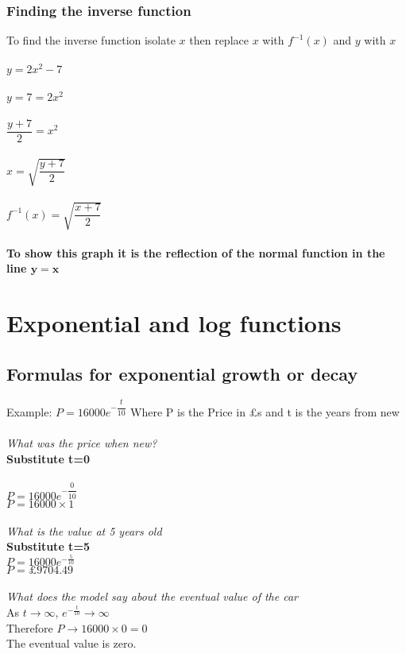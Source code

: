 \documentclass{article}[18pt]
\begin{document}
\subsubsection{Finding the inverse function}
To find the inverse function isolate $x$ then replace $x$ with $f^{-1}(x)$ and $y$ with $x$\\
\\
$y=2x^2-7$\\
\\
$y=7=2x^2$\\
\\
$\dfrac{y+7}{2}=x^2$\\
\\
$x=\sqrt{\dfrac{y+7}{2}}$\\
\\
$f^{-1}(x)=\sqrt{\dfrac{x+7}{2}}$\\
\\
\textbf{To show this graph it is the reflection of the normal function in the line $\mathbf{y=x}$}
\section{Exponential and log functions}
\subsection{Formulas for exponential growth or decay}
Example:
$P=16000e^{-\dfrac{t}{10}}$
Where P is the Price in £s and t is the years from new\\
\\
\textit{What was the price when new?}\\
\textbf{Substitute t=0}\\
\\
$P=16000e^{-\dfrac{0}{10}}$\\
$P=16000 \times 1$\\
\\
\textit{What is the value at 5 years old}\\
\textbf{Substitute t=5}\\
$P=16000e^{-\frac{5}{10}}$\\
$P=\mathsterling 9704.49$\\
\\
\textit{What does the model say about the eventual value of the car}\\
As $t \rightarrow \infty$, $e^{-\frac{t}{10}} \rightarrow \infty$\\
Therefore $P \rightarrow 16000 \times 0 = 0$\\
The eventual value is zero.
\end{document}

